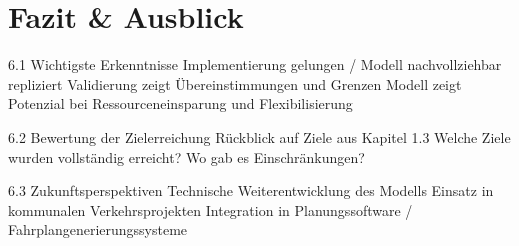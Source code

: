 \chapter{Fazit \& Ausblick}
6.1 Wichtigste Erkenntnisse
Implementierung gelungen / Modell nachvollziehbar repliziert
Validierung zeigt Übereinstimmungen und Grenzen
Modell zeigt Potenzial bei Ressourceneinsparung und Flexibilisierung

6.2 Bewertung der Zielerreichung
Rückblick auf Ziele aus Kapitel 1.3
Welche Ziele wurden vollständig erreicht? Wo gab es Einschränkungen?

6.3 Zukunftsperspektiven
Technische Weiterentwicklung des Modells
Einsatz in kommunalen Verkehrsprojekten
Integration in Planungssoftware / Fahrplangenerierungssysteme